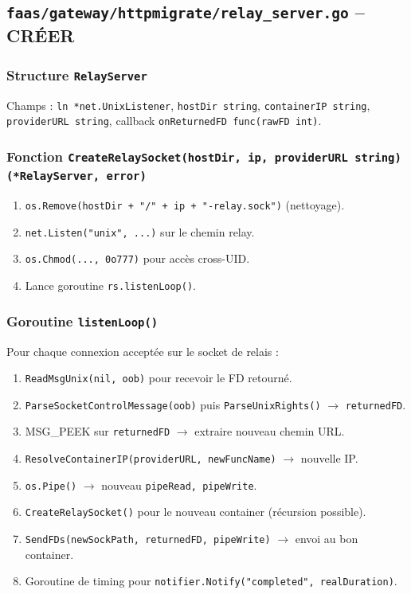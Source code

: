 \documentclass[11pt,a4paper]{article}
\begin{document}

\subsection{\texttt{faas/gateway/httpmigrate/relay\_server.go} -- CRÉER}

\subsubsection{Structure \texttt{RelayServer}}
Champs : \texttt{ln *net.UnixListener}, \texttt{hostDir string}, \texttt{containerIP string},
\texttt{providerURL string}, callback \texttt{onReturnedFD func(rawFD int)}.

\subsubsection{Fonction \texttt{CreateRelaySocket(hostDir, ip, providerURL string) (*RelayServer, error)}}
\begin{enumerate}
  \item \texttt{os.Remove(hostDir + "/" + ip + "-relay.sock")} (nettoyage).
  \item \texttt{net.Listen("unix", ...)} sur le chemin relay.
  \item \texttt{os.Chmod(..., 0o777)} pour accès cross-UID.
  \item Lance goroutine \texttt{rs.listenLoop()}.
\end{enumerate}

\subsubsection{Goroutine \texttt{listenLoop()}}
Pour chaque connexion acceptée sur le socket de relais :
\begin{enumerate}
  \item \texttt{ReadMsgUnix(nil, oob)} pour recevoir le FD retourné.
  \item \texttt{ParseSocketControlMessage(oob)} puis \texttt{ParseUnixRights()} $\to$
    \texttt{returnedFD}.
  \item MSG\_PEEK sur \texttt{returnedFD} $\to$ extraire nouveau chemin URL.
  \item \texttt{ResolveContainerIP(providerURL, newFuncName)} $\to$ nouvelle IP.
  \item \texttt{os.Pipe()} $\to$ nouveau \texttt{pipeRead, pipeWrite}.
  \item \texttt{CreateRelaySocket()} pour le nouveau container (récursion possible).
  \item \texttt{SendFDs(newSockPath, returnedFD, pipeWrite)} $\to$ envoi au bon container.
  \item Goroutine de timing pour \texttt{notifier.Notify("completed", realDuration)}.
\end{enumerate}
\end{document}
